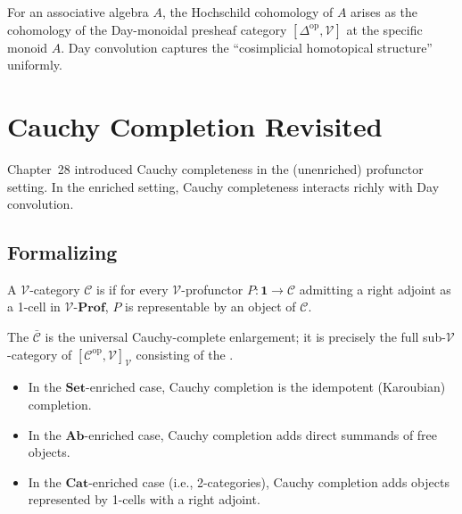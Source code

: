 \begin{example_thm}
For an associative algebra $A$, the Hochschild cohomology of $A$ arises as
the cohomology of the Day-monoidal presheaf category $[\Delta^{\mathrm{op}},
\mathcal{V}]$ at the specific monoid $A$. Day convolution captures the
``cosimplicial homotopical structure'' uniformly.
\end{example_thm}


\section{Cauchy Completion Revisited}
\label{sec:cauchy-revisited}

Chapter~28 introduced Cauchy completeness in the (unenriched) profunctor
setting. In the enriched setting, Cauchy completeness interacts richly with
Day convolution.

\subsection{Formalizing}

\begin{definition}
\label{def:enriched-cauchy}
A $\mathcal{V}$-category $\mathcal{C}$ is  if for
every $\mathcal{V}$-profunctor $P : \mathbf{1} \to \mathcal{C}$ admitting a
right adjoint as a 1-cell in $\mathcal{V}$-$\mathbf{Prof}$, $P$ is
representable by an object of $\mathcal{C}$.

The  $\bar{\mathcal{C}}$ is the universal Cauchy-complete
enlargement; it is precisely the full sub-$\mathcal{V}$-category of
$[\mathcal{C}^{\mathrm{op}}, \mathcal{V}]_\mathcal{V}$ consisting of the
.
\end{definition}

\begin{remark}
\begin{itemize}
  \item In the $\mathbf{Set}$-enriched case, Cauchy completion is the
        idempotent (Karoubian) completion.
  \item In the $\mathbf{Ab}$-enriched case, Cauchy completion adds direct
        summands of free objects.
  \item In the $\mathbf{Cat}$-enriched case (i.e., 2-categories), Cauchy
        completion adds objects represented by 1-cells with a right adjoint.
\end{itemize}
\end{remark}


